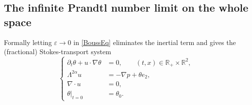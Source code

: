 \documentclass[reqno,11pt,a4paper]{amsart}
\begin{document}

\subsection{The infinite Prandtl number limit on the whole space}


Formally letting $\varepsilon\to0$ in \eqref{BoussEq}
eliminates the inertial term and gives the (fractional)
Stokes-transport system
\begin{equation}\tag{ST$_\alpha$}\label{eq:ST}
  \left\{
  \begin{aligned}
    \partial_t\theta+u\cdot\nabla\theta
      &=0,
      \qquad (t,x)\in\mathbb R_+\times\mathbb R^2,\\
    \Lambda^{2\alpha}u
      &=-\nabla p+\theta e_2,\\
    \nabla\cdot u&=0,\\
    \left.\theta\right|_{t=0}&=\theta_0.
  \end{aligned}
  \right.
\end{equation}
\end{document}
